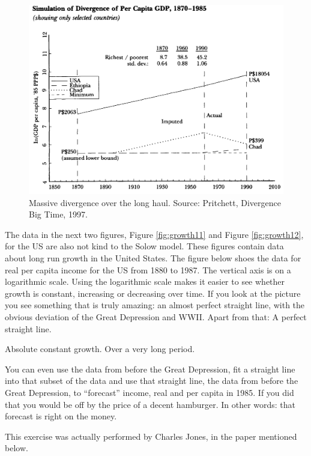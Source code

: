 \documentclass[
]{book}
\begin{document}
\begin{figure}

{\centering \includegraphics[width=1\linewidth]{img/growth/growth10} 

}

\caption{Massive divergence over the long haul. Source: Pritchett, Divergence Big Time, 1997.}\label{fig:growth10}
\end{figure}

The data in the next two figures, Figure \ref{fig:growth11} and Figure \ref{fig:growth12}, for the US are also not kind to the Solow model. These figures contain data about long run growth in the United States. The figure below shoes the data for real per capita income for the US from 1880 to 1987. The vertical axis is on a logarithmic scale. Using the logarithmic scale makes it easier to see whether growth is constant, increasing or decreasing over time. If you look at the picture you see something that is truly amazing: an almost perfect straight line, with the obvious deviation of the Great Depression and WWII. Apart from that: A perfect straight line.

Absolute constant growth. Over a very long period.

You can even use the data from before the Great Depression, fit a straight line into that subset of the data and use that straight line, the data from before the Great Depression, to ``forecast'' income, real and per capita in 1985. If you did that you would be off by the price of a decent hamburger. In other words: that forecast is right on the money.

This exercise was actually performed by Charles Jones, in the paper mentioned below.
\end{document}
